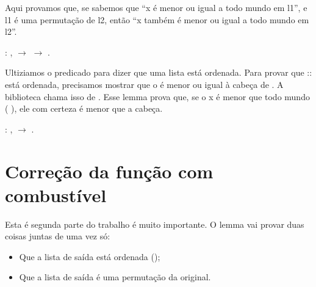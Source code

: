  Aqui provamos que, se sabemos que ``x é menor ou igual a todo mundo em l1'', e l1 é uma permutação de l2, então ``x também é menor ou igual a todo mundo em l2''.
\begin{coqdoccode}
\coqdocemptyline
\coqdocnoindent
{}  :\coqdoceol
\coqdocindent{1.00em}
\coqdockw{\ensuremath{\forall}}   ,\coqdoceol
\coqdocindent{2.00em}
   \ensuremath{\rightarrow}\coqdoceol
\coqdocindent{2.00em}
   \ensuremath{\rightarrow}\coqdoceol
\coqdocindent{2.00em}
  .\coqdoceol
\coqdocemptyline
\end{coqdoccode}
Ultiziamos o predicado  para dizer que uma lista está ordenada. 
    Para provar que  ::  está ordenada, precisamos mostrar que o  é menor ou igual à cabeça de . 
    A biblioteca chama isso de    . 
    Esse lemma prova que, se o x é menor que todo mundo (  ), ele com certeza é menor que a cabeça. 
\begin{coqdoccode}
\coqdocemptyline
\coqdocnoindent
{}  :\coqdoceol
\coqdocindent{1.00em}
\coqdockw{\ensuremath{\forall}}  ,\coqdoceol
\coqdocindent{2.00em}
   \ensuremath{\rightarrow}\coqdoceol
\coqdocindent{2.00em}
   .\coqdoceol
\coqdocemptyline
\end{coqdoccode}
\section{Correção da função com combustível}




    Esta é segunda parte do trabalho é muito importante.
    O lemma  vai provar duas coisas juntas de uma vez só:

\begin{itemize}
\item  Que a lista de saída está ordenada ();

\item  Que a lista de saída é uma permutação da original.

\end{itemize}


